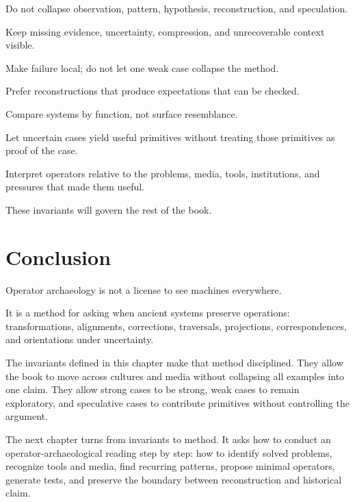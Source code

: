 \documentclass[11pt]{book}
\begin{document}
\begin{description}[leftmargin=3.5cm, style=nextline]
    \item[Level Separation]
    Do not collapse observation, pattern, hypothesis, reconstruction, and speculation.

    \item[Loss Visibility]
    Keep missing evidence, uncertainty, compression, and unrecoverable context visible.

    \item[Bounded Correction]
    Make failure local; do not let one weak case collapse the method.

    \item[Test Generation]
    Prefer reconstructions that produce expectations that can be checked.

    \item[Operator-Preserving Analogy]
    Compare systems by function, not surface resemblance.

    \item[Extraction Without Validation Collapse]
    Let uncertain cases yield useful primitives without treating those primitives as proof of the case.

    \item[Ecological Fit]
    Interpret operators relative to the problems, media, tools, institutions, and pressures that made them useful.
\end{description}

These invariants will govern the rest of the book.

\section{Conclusion}

Operator archaeology is not a license to see machines everywhere.

It is a method for asking when ancient systems preserve operations: transformations, alignments, corrections, traversals, projections, correspondences, and orientations under uncertainty.

The invariants defined in this chapter make that method disciplined. They allow the book to move across cultures and media without collapsing all examples into one claim. They allow strong cases to be strong, weak cases to remain exploratory, and speculative cases to contribute primitives without controlling the argument.

The next chapter turns from invariants to method. It asks how to conduct an operator-archaeological reading step by step: how to identify solved problems, recognize tools and media, find recurring patterns, propose minimal operators, generate tests, and preserve the boundary between reconstruction and historical claim.
\end{document}
